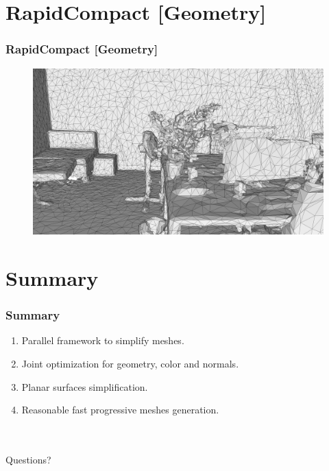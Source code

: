 \documentclass[
	10pt,
	t		%
]{beamer}
\begin{document}
\section{RapidCompact [Geometry]}
\begin{frame}
\frametitle{RapidCompact [Geometry]}
\begin{figure}[ht]
\centering
\includegraphics[width=1\textwidth]{rapid_compact}
\end{figure}
\end{frame}

\section{Summary}
\begin{frame}
\frametitle{Summary}
\centering
\begin{enumerate}
\item Parallel framework to simplify meshes.
\item Joint optimization for geometry, color and normals.
\item Planar surfaces simplification.
\item Reasonable fast progressive meshes generation.\\~\\~\\
\end{enumerate}
Questions?
\end{frame}
\end{document}
